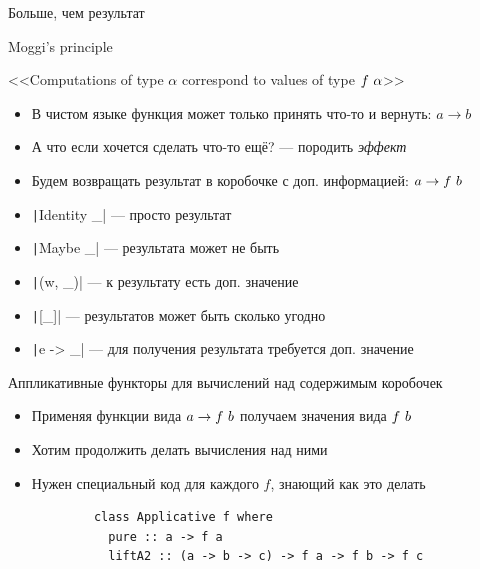     
    \begin{frame}[fragile]{Больше, чем результат}
        \begin{block}{Moggi's principle}
            \begin{center}
                <<Computations of type $\alpha$ correspond to values of type $f~\alpha$>>
            \end{center}
        \end{block}
        \begin{itemize}
            \item В чистом языке функция может только принять что-то и вернуть: $a\to b$
            \item А что если хочется сделать что-то ещё? --- породить \emph{эффект}
            \item Будем возвращать результат в коробочке с доп. информацией: $a\to f~ b$
            \item[\eg] \texttt|Identity _| --- просто результат
            \item[\eg] \texttt|Maybe _| --- результата может не быть
            \item[\eg] \texttt|(w, _)| --- к результату есть доп. значение
            \item[\eg] \texttt|[_]| --- результатов может быть сколько угодно
            \item[\eg] \texttt|e -> _| --- для получения результата требуется доп. значение
        \end{itemize}
    \end{frame}

    \begin{frame}[fragile]{Аппликативные функторы для вычислений над содержимым коробочек}
        \begin{itemize}
            \item Применяя функции вида $a \to f ~ b$ получаем значения вида $f ~ b$
            \item Хотим продолжить делать вычисления над ними
            \item Нужен специальный код для каждого $f$, знающий как это делать
        \end{itemize}
        \pause
        \vspace{0.5em}
        \begin{verbatim}
            class Applicative f where
              pure :: a -> f a
              liftA2 :: (a -> b -> c) -> f a -> f b -> f c
        \end{verbatim}
    \end{frame}
    
